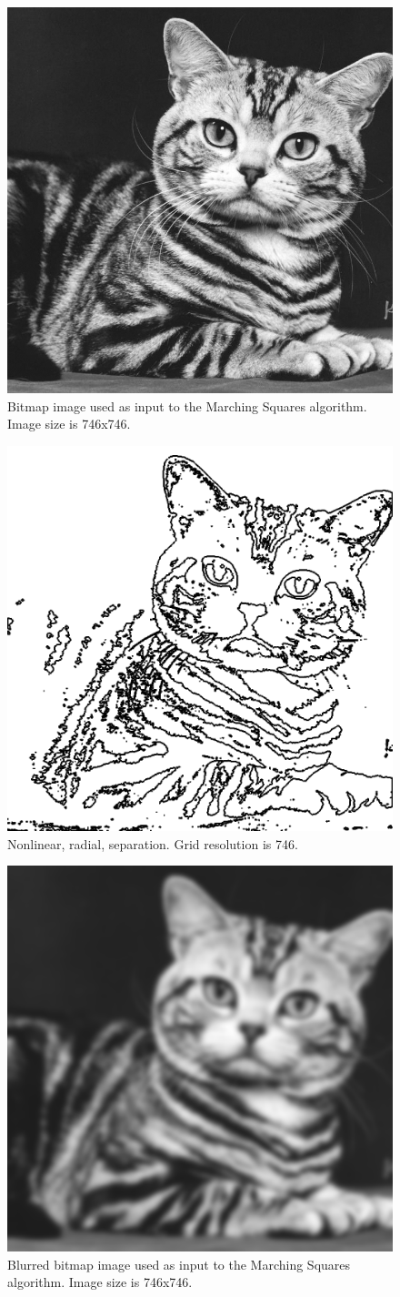 \documentclass[12pt]{article}
\begin{document}
\begin{figure} 
\centering
  \includegraphics[width = 3 in]{cat_image.png}
  \caption{Bitmap image used as input to the Marching Squares algorithm.
Image size is 746x746.
}
\end{figure}


\begin{figure} 
\centering
  \includegraphics[width = 3 in]{cat_isosurface.png}
  \caption{Nonlinear, radial, separation.
Grid resolution is 746.
}
\end{figure}


\begin{figure} 
\centering
  \includegraphics[width = 3 in]{cat_blurred_image.png}
  \caption{Blurred bitmap image used as input to the Marching Squares algorithm.
Image size is 746x746.
}
\end{figure}
\end{document}
